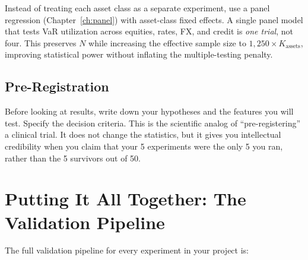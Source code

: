 Instead of treating each asset class as a separate experiment, use a panel regression (Chapter~\ref{ch:panel}) with asset-class fixed effects. A single panel model that tests VaR utilization across equities, rates, FX, and credit is \emph{one trial}, not four. This preserves $N$ while increasing the effective sample size to $1{,}250 \times K_{\text{assets}}$, improving statistical power without inflating the multiple-testing penalty.

\subsection{Pre-Registration}

Before looking at results, write down your hypotheses and the features you will test. Specify the decision criteria. This is the scientific analog of ``pre-registering'' a clinical trial. It does not change the statistics, but it gives you intellectual credibility when you claim that your 5 experiments were the only 5 you ran, rather than the 5 survivors out of 50.

\section{Putting It All Together: The Validation Pipeline}
\label{sec:validation-pipeline}

The full validation pipeline for every experiment in your project is:

